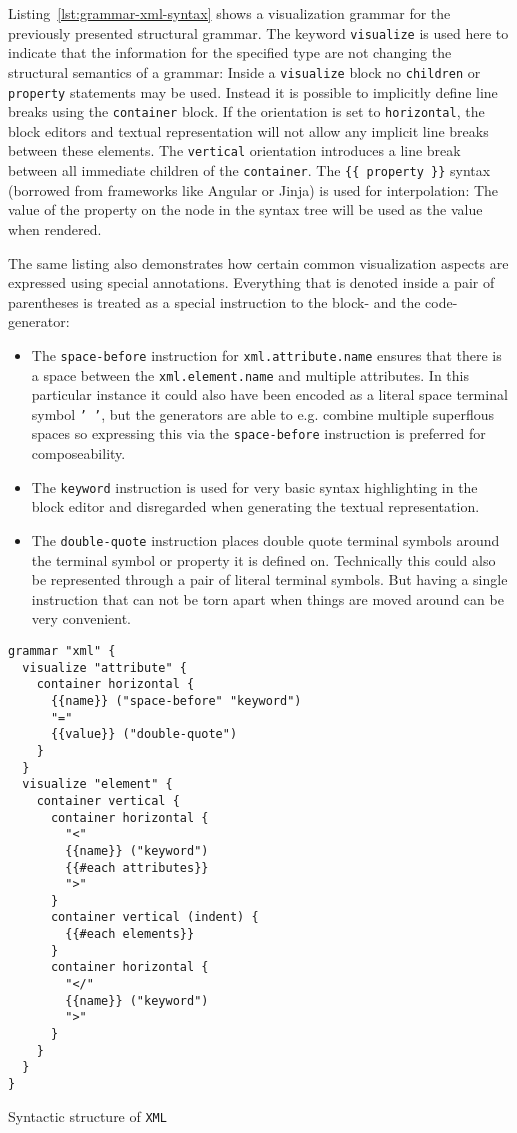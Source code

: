\documentclass[sigconf,natbib=false]{acmart}
\newenvironment{longlisting}{\captionsetup{type=listing} \vspace{1.5em}}{\vspace{1.5em}}
\begin{document}
Listing~\ref{lst:grammar-xml-syntax} shows a visualization grammar for the previously presented structural grammar. The keyword \texttt{visualize} is used here to indicate that the information for the specified type are not changing the structural semantics of a grammar: Inside a \texttt{visualize} block no \texttt{children} or \texttt{property} statements may be used. Instead it is possible to implicitly define line breaks using the \texttt{container} block. If the orientation is set to \texttt{horizontal}, the block editors and textual representation will not allow any implicit line breaks between these elements. The \texttt{vertical} orientation introduces a line break between all immediate children of the \texttt{container}. The \texttt{\{\{ property \}\}} syntax (borrowed from frameworks like Angular or Jinja) is used for interpolation: The value of the property on the node in the syntax tree will be used as the value when rendered.

The same listing also demonstrates how certain common visualization aspects are expressed using special annotations. Everything that is denoted inside a pair of parentheses is treated as a special instruction to the block- and the code-generator:
\begin{itemize}
\item The \texttt{space-before} instruction for \texttt{xml.attribute.name} ensures that there is a space between the \texttt{xml.element.name} and multiple attributes. In this particular instance it could also have been encoded as a literal space terminal symbol \texttt{'~'}, but the generators are able to e.g. combine multiple superflous spaces so expressing this via the \texttt{space-before} instruction is preferred for composeability.
\item The \texttt{keyword} instruction is used for very basic syntax highlighting in the block editor and disregarded when generating the textual representation.
\item The \texttt{double-quote} instruction places double quote terminal symbols around the terminal symbol or property it is defined on. Technically this could also be represented through a pair of literal terminal symbols. But having a single instruction that can not be torn apart when things are moved around can be very convenient.
\end{itemize}

\begin{longlisting}
\begin{verbatim}
grammar "xml" {
  visualize "attribute" {
    container horizontal {
      {{name}} ("space-before" "keyword")
      "="
      {{value}} ("double-quote")
    }
  }
  visualize "element" {
    container vertical {
      container horizontal {
        "<"
        {{name}} ("keyword")
        {{#each attributes}}
        ">"
      }
      container vertical (indent) {
        {{#each elements}}
      }
      container horizontal {
        "</"
        {{name}} ("keyword")
        ">"
      }
    }
  }
}
\end{verbatim}
\caption{Syntactic structure of \texttt{XML}}
\label{lst:grammar-xml-syntax}
\end{longlisting}
\end{document}
